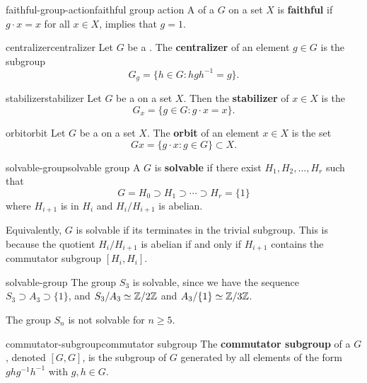 \begin{topic}{faithful-group-action}{faithful group action}
    A  of a  $G$ on a set $X$ is \textbf{faithful} if $g \cdot x = x$ for all $x \in X$, implies that $g = 1$.
\end{topic}

\begin{topic}{centralizer}{centralizer}
    Let $G$ be a . The \textbf{centralizer} of an element $g \in G$ is the subgroup
    \[ G_g = \{ h \in G : h g h^{-1} = g \} . \]
\end{topic}

\begin{topic}{stabilizer}{stabilizer}
    Let $G$ be a   on a set $X$. Then the \textbf{stabilizer} of $x \in X$ is the 
    \[ G_x = \{ g \in G : g \cdot x = x \} . \]
\end{topic}

\begin{topic}{orbit}{orbit}
    Let $G$ be a   on a set $X$. The \textbf{orbit} of an element $x \in X$ is the set
    \[ Gx = \{ g \cdot x : g \in G \} \subset X . \]
\end{topic}

\begin{topic}{solvable-group}{solvable group}
    A  $G$ is \textbf{solvable} if there exist  $H_1, H_2, \ldots, H_r$ such that
    \[ G = H_0 \supset H_1 \supset \cdots \supset H_r = \{ 1 \} \]
    where $H_{i + 1}$ is  in $H_i$ and $H_i/H_{i + 1}$ is abelian.
    
    Equivalently, $G$ is solvable if its  terminates in the trivial subgroup. This is because the quotient $H_i/H_{i + 1}$ is abelian if and only if $H_{i + 1}$ contains the commutator subgroup $[H_i, H_i]$.
\end{topic}

\begin{example}{solvable-group}
    The group $S_3$ is solvable, since we have the sequence $S_3 \supset A_3 \supset \{ 1 \}$, and $S_3 / A_3 \simeq \mathbb{Z}/2\mathbb{Z}$ and $A_3/\{ 1 \} \simeq \mathbb{Z}/3\mathbb{Z}$.
    
    The group $S_n$ is not solvable for $n \ge 5$.
\end{example}

\begin{topic}{commutator-subgroup}{commutator subgroup}
    The \textbf{commutator subgroup} of a  $G$, denoted $[G, G]$, is the subgroup of $G$ generated by all elements of the form $ghg^{-1}h^{-1}$ with $g, h \in G$.
\end{topic}

